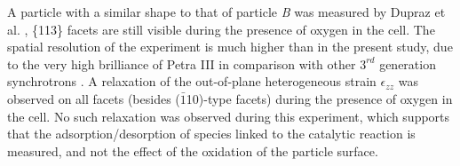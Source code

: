 A particle with a similar shape to that of particle \textit{B} was measured by Dupraz et al. \parencite*{Dupraz2022}, \{113\} facets are still visible during the presence of oxygen in the cell.
The spatial resolution of the experiment is much higher than in the present study, due to the very high brilliance of Petra III in comparison with other $3^{rd}$ generation synchrotrons \parencite{Bilderback2005}.
A relaxation of the out-of-plane heterogeneous strain $\epsilon_{zz}$ was observed on all facets (besides ($\bar{1}$10)-type facets) during the presence of oxygen in the cell.
No such relaxation was observed during this experiment, which supports that the adsorption/desorption of species linked to the catalytic reaction is measured, and not the effect of the oxidation of the particle surface.

